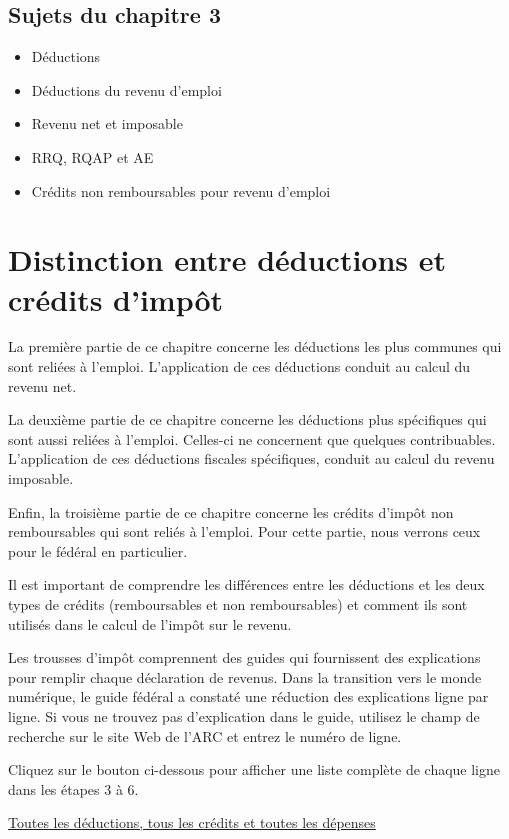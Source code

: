 \subsection{Sujets du chapitre 3}
\begin{itemize}
	\item Déductions
	\item Déductions du revenu d'emploi
	\item Revenu net et imposable
	\item RRQ, RQAP et AE
	\item Crédits non remboursables pour revenu d'emploi
\end{itemize}



\section{Distinction entre déductions et crédits d'impôt}
\begin{intro}
	La première partie de ce chapitre concerne les déductions les plus communes qui sont reliées à l'emploi. L'application de ces déductions conduit au calcul du revenu net.
	
	La deuxième partie de ce chapitre concerne les déductions plus spécifiques qui sont aussi reliées à l'emploi. Celles-ci ne concernent que quelques contribuables. L'application de ces déductions fiscales spécifiques, conduit au calcul du revenu imposable.
	
	Enfin, la troisième partie de ce chapitre concerne les crédits d'impôt non remboursables qui sont reliés à l'emploi. Pour cette partie, nous verrons ceux pour le fédéral en particulier.
	
	Il est important de comprendre les différences entre les déductions et les deux types de crédits (remboursables et non remboursables) et comment ils sont utilisés dans le calcul de l'impôt sur le revenu.
\end{intro}
\begin{note}
	Les trousses d'impôt comprennent des guides qui fournissent des explications pour remplir chaque déclaration de revenus. Dans la transition vers le monde numérique, le guide fédéral a constaté une réduction des explications ligne par ligne. Si vous ne trouvez pas d'explication dans le guide, utilisez le champ de recherche sur le site Web de l'ARC et entrez le numéro de ligne.
	
	Cliquez sur le bouton ci-dessous pour afficher une liste complète de chaque ligne dans les étapes 3 à 6.
	
	\cat\href{https://www.canada.ca/fr/agence-revenu/services/impot/particuliers/sujets/tout-votre-declaration-revenus/declaration-revenus/remplir-declaration-revenus/deductions-credits-depenses/toutes-deductions-tous-credits-toutes-depenses.html}{Toutes les déductions, tous les crédits et toutes les dépenses}
\end{note}


